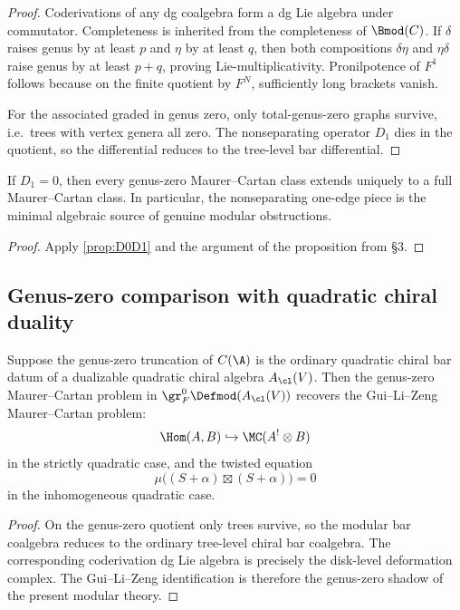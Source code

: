 \begin{proof}
Coderivations of any dg coalgebra form a dg Lie algebra under commutator. Completeness
is inherited from the completeness of $\Bmod(C)$. If $\delta$ raises genus by at least $p$
and $\eta$ by at least $q$, then both compositions $\delta\eta$ and $\eta\delta$ raise genus
by at least $p+q$, proving Lie-multiplicativity. Pronilpotence of $F^1$ follows because on
the finite quotient by $F^N$, sufficiently long brackets vanish.

For the associated graded in genus zero, only total-genus-zero graphs survive, i.e.\ trees
with vertex genera all zero. The nonseparating operator $D_1$ dies in the quotient, so the
differential reduces to the tree-level bar differential.
\end{proof}

\begin{corollary}
If $D_1=0$, then every genus-zero Maurer--Cartan class extends uniquely to a full
Maurer--Cartan class. In particular, the nonseparating one-edge piece is the minimal
algebraic source of genuine modular obstructions.
\end{corollary}

\begin{proof}
Apply \cref{prop:D0D1} and the argument of the proposition from \S3.
\end{proof}

\subsection{Genus-zero comparison with quadratic chiral duality}

\begin{proposition}
Suppose the genus-zero truncation of $C(\A)$ is the ordinary quadratic chiral bar datum
of a dualizable quadratic chiral algebra $A_{\cl}(V)$. Then the genus-zero Maurer--Cartan
problem in $\gr_F^0\Defmod(A_{\cl}(V))$ recovers the Gui--Li--Zeng Maurer--Cartan problem:
\[
\Hom(A,B)\hookrightarrow \MC(A^!\otimes B)
\]
in the strictly quadratic case, and the twisted equation
\[
\mu\big((S+\alpha)\boxtimes (S+\alpha)\big)=0
\]
in the inhomogeneous quadratic case.
\end{proposition}

\begin{proof}
On the genus-zero quotient only trees survive, so the modular bar coalgebra reduces to the
ordinary tree-level chiral bar coalgebra. The corresponding coderivation dg Lie algebra is
precisely the disk-level deformation complex. The Gui--Li--Zeng identification is therefore
the genus-zero shadow of the present modular theory.
\end{proof}

